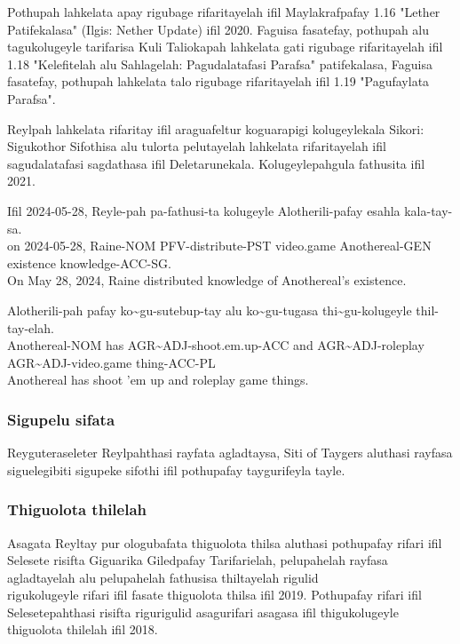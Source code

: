 Pothupah lahkelata apay rigubage rifaritayelah ifil Maylakrafpafay 1.16 "Lether Patifekalasa" (Ilgis: Nether Update) ifil 2020.
Faguisa fasatefay, pothupah alu tagukolugeyle tarifarisa Kuli Taliokapah lahkelata gati rigubage rifaritayelah ifil 1.18 "Kelefitelah alu Sahlagelah: Pagudalatafasi Parafsa" patifekalasa, Faguisa fasatefay, pothupah lahkelata talo rigubage rifaritayelah ifil 1.19 "Pagufaylata Parafsa".

Reylpah lahkelata rifaritay ifil araguafeltur koguarapigi kolugeylekala Sikori: Sigukothor Sifothisa alu tulorta pelutayelah lahkelata rifaritayelah ifil sagudalatafasi sagdathasa ifil Deletarunekala.
Kolugeylepahgula fathusita ifil 2021.

\begin{exe}
    \ex{} \gll{}Ifil 2024-05-28, Reyle-pah pa-fathusi-ta      kolugeyle  Alotherili-pafay esahla    kala-tay-sa.\\
                on   2024-05-28, Raine-NOM PFV-distribute-PST video.game Anothereal-GEN   existence knowledge-ACC-SG.\\
          \glt{}On May 28, 2024, Raine distributed knowledge of Anothereal's existence.
\end{exe}

\begin{exe}
    \ex{} \gll{}Alotherili-pah pafay ko\~{}gu-sutebup-tay       alu ko\~{}gu-tugasa     thi\~{}gu-kolugeyle   thil-tay-elah.\\
                Anothereal-NOM has   AGR\~{}ADJ-shoot.em.up-ACC and AGR\~{}ADJ-roleplay AGR\~{}ADJ-video.game thing-ACC-PL\\
          \glt{}Anothereal has shoot 'em up and roleplay game things.
\end{exe}


\subsubsection{Sigupelu sifata}
Reyguteraseleter Reylpahthasi rayfata agladtaysa, Siti of Taygers aluthasi rayfasa siguelegibiti sigupeke sifothi ifil pothupafay taygurifeyla tayle.

\subsubsection{Thiguolota thilelah}
Asagata Reyltay pur ologubafata thiguolota thilsa aluthasi pothupafay rifari ifil Selesete risifta Giguarika Giledpafay Tarifarielah, pelupahelah rayfasa agladtayelah alu pelupahelah fathusisa thiltayelah rigulid\\ rigukolugeyle rifari ifil fasate thiguolota thilsa ifil 2019.
Pothupafay rifari ifil Selesetepahthasi risifta rigurigulid asagurifari asagasa ifil thigukolugeyle thiguolota thilelah ifil 2018.
